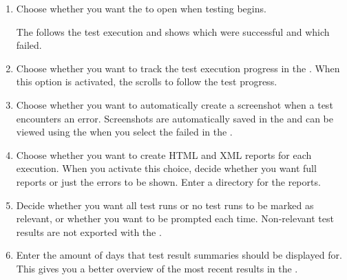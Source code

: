\begin{enumerate}
\item Choose whether you want the  \gdtestresultview{} to open when testing begins. 

The \gdtestresultview{} follows the test execution and shows which \gdsteps{} were successful and which failed. 

\item Choose whether you want to track the test execution progress in the \gdtestresultview{}. When this option is activated, the \gdtestresultview{} scrolls to follow the test progress. 
\item Choose whether you want to automatically create a screenshot when a test encounters an error. Screenshots are automatically saved in the \gddb{} and can be viewed using the \gdimgview{} when you select the failed \gdstep{} in the \gdtestresultview{}. 
\item Choose whether you want to create HTML and XML reports for each execution. When you activate this choice, decide whether you want full reports or just the errors to be shown. Enter a directory for the reports. 
\item Decide whether you want all test runs or no test runs to be marked as relevant, or whether you want to be prompted each time. Non-relevant test results are not exported with the \gdproject{}. 
\item Enter the amount of days that test result summaries should be displayed for. This gives you a better overview of the most recent results in the \gdtestsummaryview{}. 
\end{enumerate}


